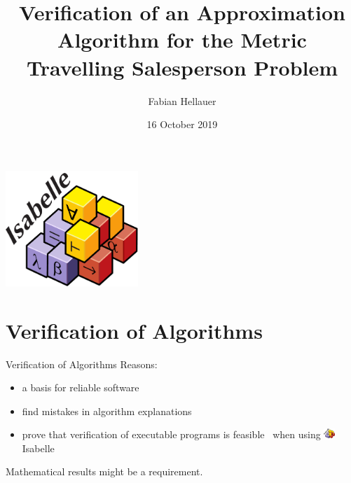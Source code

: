 \documentclass[%
	sans,
	12pt,
]{beamer}
\title{Verification of an Approximation Algorithm for the Metric Travelling Salesperson Problem}
\author{\normalsize Fabian Hellauer}
\institute[]{\footnotesize Technische Universität München}
\date{\footnotesize16 October 2019}
\begin{document}
\maketitle

\begin{frame}
\begin{center}
\includegraphics[width=5cm]{isabelle.pdf}
\end{center}
\end{frame}

\tableofcontents	%

\newcommand{\pivot}[1]{{\color{red}#1}}
\newcommand{\ltpiv}[1]{{\color{blue}#1}}
\newcommand{\gtpiv}[1]{{\color{olive}#1}}

\section{Verification of Algorithms}
\begin{frame}{Verification of Algorithms}
Reasons:
\begin{itemize}
	\item a basis for reliable software\pause
	\item find mistakes in algorithm explanations\pause
	\item prove that verification of executable programs
	is feasible\ %
	 when using \includegraphics[height=1em]{isabelle.pdf}Isabelle\pause
\end{itemize}
Mathematical results might be a requirement.
\end{frame}
\end{document}
